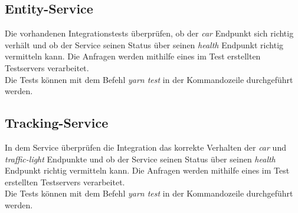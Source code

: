 \subsection{Entity-Service}
Die vorhandenen Integrationstests überprüfen, ob der \textit{car} Endpunkt sich richtig verhält und ob der Service seinen Status über seinen \textit{health} Endpunkt richtig vermitteln kann. Die Anfragen werden mithilfe eines im Test erstellten Testservers verarbeitet.\\
Die Tests können mit dem Befehl \textit{yarn test} in der Kommandozeile durchgeführt werden. 
\subsection{Tracking-Service}
In dem Service überprüfen die Integration das korrekte Verhalten der \textit{car} und \textit{traffic-light} Endpunkte und ob der Service seinen Status über seinen \textit{health} Endpunkt richtig vermitteln kann.  Die Anfragen werden mithilfe eines im Test erstellten Testservers verarbeitet.\\
Die Tests können mit dem Befehl \textit{yarn test} in der Kommandozeile durchgeführt werden.
